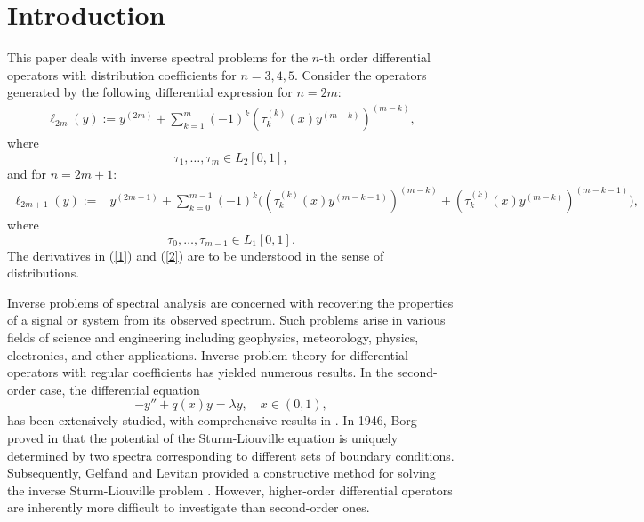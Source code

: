 \documentclass[reqno,12pt,centertags]{amsart}
\numberwithin{equation}{section}
\theoremstyle{definition}
\begin{document}
\section{Introduction}
This paper deals with inverse spectral problems for the $n$-th order differential operators with distribution coefficients for $n=3,4,5$. Consider the operators generated by the following differential expression for $n=2m$:
	\begin{align}\label{1}
	\ell_{2m}(y) := y^{(2m)} + \sum_{k = 1}^{m}(-1)^{k} (\tau_{k}^{(k)}(x) y^{(m-k)})^{(m-k)},
\end{align}
where $$\tau_{1},\dots,\tau_{m}\in L_2[0,1],$$
and for $n=2m+1$:
	\begin{align}\label{2}
	\ell_{2m+1}(y)\! := & y^{(2m+1)} + \!\sum_{k = 0}^{m-1}(-1)^{k}\bigg( (\tau_{k}^{(k)}(x) y^{(m-k-1)})^{(m-k)}\!+\!(\tau_{k}^{(k)}(x) y^{(m-k)})^{(m-k-1)}\bigg),
\end{align}
where $$\tau_{0},\dots,\tau_{m-1}\in L_1[0,1].$$
The derivatives in (\ref{1}) and (\ref{2})  are to be understood in the sense of distributions.

Inverse problems of spectral analysis are concerned with recovering the properties of a signal or system from its observed spectrum. Such problems arise in various fields of science and engineering including geophysics, meteorology, physics, electronics, and other applications. Inverse problem theory for differential operators with regular coefficients has yielded numerous results. In the second-order case, the differential equation
\[ -y'' + q(x) y = \lambda y, \quad x \in (0, 1), \]
has been extensively studied, with comprehensive results in \cite{FY01, Krav20, Lev87, Mar86}. In 1946, Borg proved in \cite{Bor} that the potential of the Sturm-Liouville equation is uniquely determined by two spectra corresponding to different sets of boundary conditions. Subsequently, Gelfand and Levitan provided a constructive method for solving the inverse Sturm-Liouville problem \cite{GL51}. However, higher-order differential operators are inherently more difficult to investigate than second-order ones. 
\end{document}
